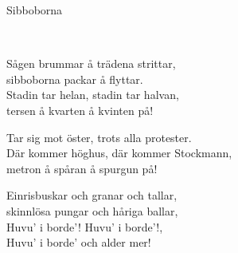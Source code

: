 \begin{song}{Sibboborna}
	
	
	\\
	
	Sågen brummar å trädena strittar,\\
	sibboborna packar å flyttar.\\
	Stadin tar helan, stadin tar halvan,\\
	tersen å kvarten å kvinten på!
	
	Tar sig mot öster, trots alla protester.\\
	Där kommer höghus, där kommer Stockmann,\\
	metron å spåran å spurgun på!
	
	Einrisbuskar och granar och tallar,\\
	skinnlösa pungar och håriga ballar,\\
	Huvu' i borde'! Huvu' i borde'!,\\
	Huvu' i borde' och alder mer!
	
\end{song}
